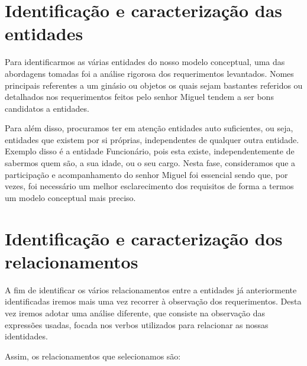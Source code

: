 \section{Identificação e caracterização das entidades}
Para identificarmos as várias entidades do nosso modelo conceptual, uma das abordagens tomadas foi a análise rigorosa dos requerimentos levantados. Nomes principais referentes a um ginásio ou objetos os quais sejam bastantes referidos  ou detalhados nos requerimentos feitos pelo senhor Miguel tendem a ser bons candidatos a entidades. \par
Para além disso, procuramos ter em atenção entidades auto suficientes, ou seja, entidades que existem por si próprias, independentes de qualquer outra entidade. Exemplo disso é a entidade Funcionário, pois esta existe, independentemente de sabermos quem são, a sua idade, ou o seu cargo.
Nesta fase, consideramos que a participação e acompanhamento do senhor Miguel foi essencial sendo que, por vezes, foi necessário um melhor esclarecimento dos requisitos de forma a termos um modelo conceptual mais preciso.

\clearpage

\section{Identificação e caracterização dos relacionamentos}

A fim de identificar os vários relacionamentos entre a entidades já anteriormente identificadas iremos mais uma vez  recorrer à  observação dos requerimentos. Desta vez iremos adotar uma análise diferente, que consiste na observação das expressões usadas, focada nos verbos utilizados para relacionar as nossas identidades.\par
Assim, os relacionamentos que selecionamos são:
\vspace{10 pt}


\begin{table}[ht]
\centering
{}
\end{table}
\newpage

